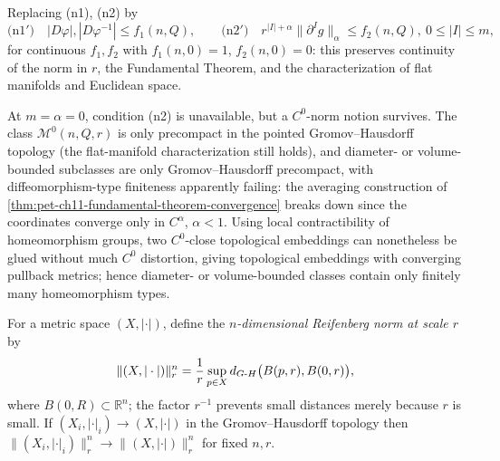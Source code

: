 \begin{remark}
  \label{rem:pet-ch11-alternative-norm-conditions}

  Replacing (n1), (n2) by
  \[
    \text{(n1$'$)}\quad|D\varphi|,|D\varphi^{-1}|\le f_1(n,Q),\qquad
    \text{(n2$'$)}\quad r^{|I|+\alpha}\|\partial^Ig\|_\alpha\le f_2(n,Q),\ 0\le|I|\le m,
  \]
  for continuous $f_1,f_2$ with $f_1(n,0)=1$, $f_2(n,0)=0$: this preserves
  continuity of the norm in $r$, the Fundamental Theorem, and the
  characterization of flat manifolds and Euclidean space.
\end{remark}

\begin{remark}
  \label{rem:pet-ch11-c0-norm-precompactness-only}

  At $m=\alpha=0$, condition (n2) is unavailable, but a $C^0$-norm notion
  survives. The class $\mathcal{M}^0(n,Q,r)$ is only precompact in the
  pointed Gromov--Hausdorff topology (the flat-manifold characterization
  still holds), and diameter- or volume-bounded subclasses are only
  Gromov--Hausdorff precompact, with diffeomorphism-type finiteness
  apparently failing: the averaging construction of
  \cref{thm:pet-ch11-fundamental-theorem-convergence} breaks down since the
  coordinates converge only in $C^{\alpha}$, $\alpha<1$. Using local
  contractibility of homeomorphism groups, two $C^0$-close topological
  embeddings can nonetheless be glued without much $C^0$ distortion, giving
  topological embeddings with converging pullback metrics; hence
  diameter- or volume-bounded classes contain only finitely many
  homeomorphism types.
\end{remark}

\begin{definition}
  \label{def:pet-ch11-reifenberg-norm}

  For a metric space $(X,|\cdot|)$, define the \emph{$n$-dimensional Reifenberg norm
  at scale $r$} by
  \[
    \|(X,|\cdot|)\|^n_r=\frac1r\sup_{p\in X}d_{G\text{-}H}\big(B(p,r),B(0,r)\big),
  \]
  where $B(0,R)\subset\mathbb{R}^n$; the factor $r^{-1}$ prevents small distances
  merely because $r$ is small. If $(X_i,|\cdot|_i)\to(X,|\cdot|)$ in the
  Gromov--Hausdorff topology then $\|(X_i,|\cdot|_i)\|^n_r\to\|(X,|\cdot|)\|^n_r$
  for fixed $n,r$.
\end{definition}

